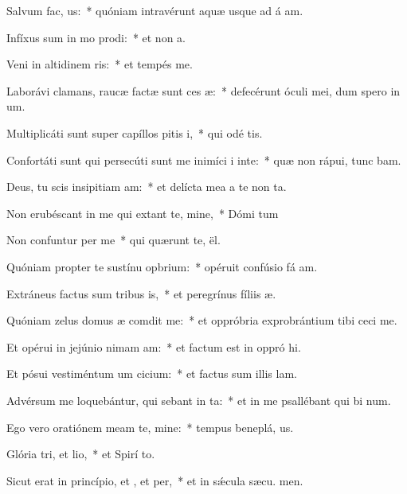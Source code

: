 \item Salvum  fac, us:~* quóniam intravérunt aquæ usque ad á am.
\item Infíxus sum in mo prodi:~* et non  a.
\item Veni in altidinem ris:~* et tempés  me.
\item Laborávi clamans, raucæ factæ sunt ces æ:~* defecérunt óculi mei, dum spero in  um.
\item Multiplicáti sunt super capíllos pitis i,~* qui odé  tis.
\item Confortáti sunt qui persecúti sunt me inimíci i inte:~* quæ non rápui, tunc bam.
\item Deus, tu scis insipitiam am:~* et delícta mea a te non  ta.
\item Non erubéscant in me qui extant te, mine,~* Dómi tum
\item Non confuntur per me~* qui quærunt te,  ël.
\item Quóniam propter te sustínu opbrium:~* opéruit confúsio fá am.
\item Extráneus factus sum tribus is,~* et peregrínus fíliis  æ.
\item Quóniam zelus domus æ comdit me:~* et oppróbria exprobrántium tibi ceci  me.
\item Et opérui in jejúnio nimam am:~* et factum est in oppró hi.
\item Et pósui vestiméntum um cicium:~* et factus sum illis  lam.
\item Advérsum me loquebántur, qui sebant in ta:~* et in me psallébant qui bi num.
\item Ego vero oratiónem meam  te, mine:~* tempus beneplá, us.
\item Glória tri, et lio,~* et Spirí to.
\item Sicut erat in princípio, et , et per,~* et in sǽcula sæcu. men.
